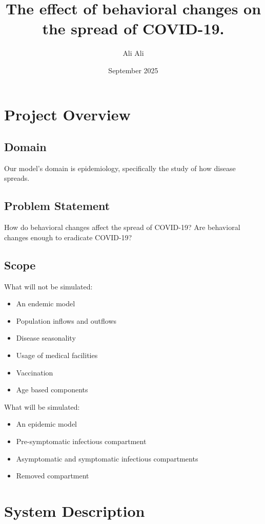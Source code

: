 \documentclass{article}
\title{The effect of behavioral changes on the spread of COVID-19.}
\author{Ali Ali}
\date{September 2025}
\begin{document}
\maketitle
\section{Project Overview}
\subsection{Domain}
Our model's domain is epidemiology, specifically the study of how disease spreads.
\subsection{Problem Statement}
How do behavioral changes affect the spread of COVID-19? Are behavioral changes enough to eradicate COVID-19?
\subsection{Scope}
What will not be simulated:
\begin{itemize}
  \item An endemic model
  \item Population inflows and outflows
  \item Disease seasonality
  \item Usage of medical facilities
  \item Vaccination
  \item Age based components
\end{itemize}
What will be simulated:
\begin{itemize}
  \item An epidemic model  
  \item Pre-symptomatic infectious compartment
  \item Asymptomatic and symptomatic infectious compartments  
  \item Removed compartment
\end{itemize}

\section{System Description}
\end{document}
